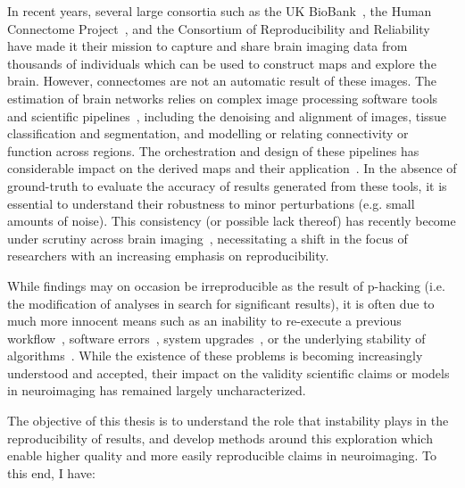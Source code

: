 In recent years, several large consortia such as the UK BioBank~\cite{sudlow2015uk}, the Human Connectome
Project~\cite{van2013wu}, and the Consortium of Reproducibility and Reliability~\cite{zuo2014open} have made it their
mission to capture and share brain imaging data from thousands of individuals which can be used to construct maps and
explore the brain. However, connectomes are not an automatic result of these images. The estimation of brain networks
relies on complex image processing software tools and scientific
pipelines~\cite{hagmann2005diffusion,esteban2019fmriprep}, including the denoising and alignment of images, tissue
classification and segmentation, and modelling or relating connectivity or function across regions. The orchestration
and design of these pipelines has considerable impact on the derived maps and their
application~\cite{bowring2019exploring,klein2009evaluation}. In the absence of ground-truth to evaluate the accuracy of
results generated from these tools, it is essential to understand their robustness to minor perturbations (e.g.
small amounts of noise). This consistency (or possible lack thereof) has recently become under scrutiny across brain
imaging~\cite{glatard2015reproducibility,Lewis2017-ll,eklund2016cluster}, necessitating a shift in the focus of
researchers with an increasing emphasis on reproducibility.

While findings may on occasion be irreproducible as the result of p-hacking (i.e. the modification of analyses in
search for significant results), it is often due to much more innocent means such as an inability to re-execute a
previous workflow~\cite{collberg2016repeatability}, software errors~\cite{eklund2016cluster}, system
upgrades~\cite{salari2020file}, or the underlying stability of algorithms~\cite{Lewis2017-ll}. While the existence of
these problems is becoming increasingly understood and accepted, their impact on the validity scientific claims or
models in neuroimaging has remained largely uncharacterized.

The objective of this thesis is to understand the role that instability plays in the reproducibility of results, and
develop methods around this exploration which enable higher quality and more easily reproducible claims in
neuroimaging. To this end, I have:

